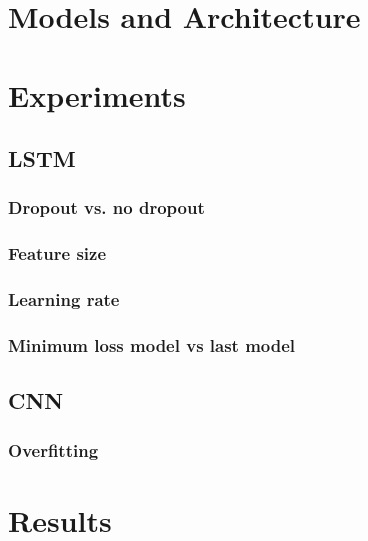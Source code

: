 \documentclass[a4paper]{article}
\begin{document}

\section{Models and Architecture}


\section{Experiments}
\subsection{LSTM}
\subsubsection{Dropout vs. no dropout}
\subsubsection{Feature size}
\subsubsection{Learning rate}
\subsubsection{Minimum loss model vs last model}

\subsection{CNN}
\subsubsection{Overfitting}

\section{Results}
\end{document}
